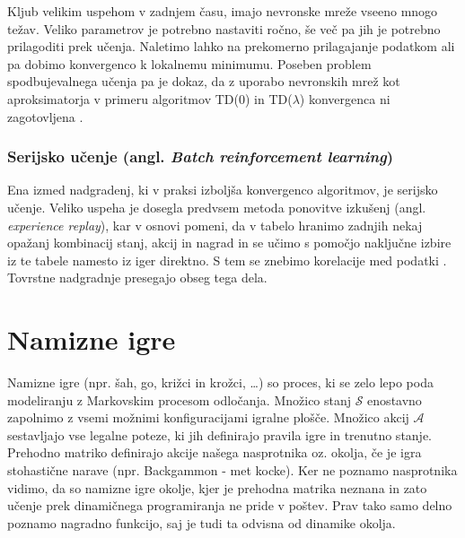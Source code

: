 \documentclass[12pt,a4paper]{amsart}
\theoremstyle{definition} %
\theoremstyle{plain} %
\begin{document}
Kljub velikim uspehom v zadnjem času, imajo nevronske mreže vseeno mnogo težav. Veliko parametrov je 
potrebno nastaviti ročno, še več pa jih je potrebno prilagoditi prek učenja. Naletimo lahko na 
prekomerno prilagajanje podatkom ali pa dobimo konvergenco k lokalnemu minimumu.
Poseben problem spodbujevalnega učenja pa je dokaz, da z uporabo nevronskih mrež kot aproksimatorja 
v primeru algoritmov TD($0$) in TD($\lambda$) konvergenca ni zagotovljena \cite{RLintro}.

\subsubsection{Serijsko učenje (angl. \textit{Batch reinforcement learning})}
Ena izmed nadgradenj, ki v praksi izboljša konvergenco algoritmov, je serijsko učenje. Veliko uspeha 
je dosegla predvsem metoda ponovitve izkušenj (angl. \textit{experience replay}), kar v osnovi pomeni, 
da v tabelo hranimo zadnjih nekaj opažanj kombinacij stanj, akcij in nagrad in se učimo s pomočjo 
naključne izbire iz te tabele namesto iz iger direktno. S tem se znebimo korelacije med podatki 
\cite{LecNotesSilver}. Tovrstne nadgradnje presegajo obseg tega dela.

\section{Namizne igre}\label{nm}
Namizne igre (npr. šah, go, križci in krožci, \dots) so proces, ki se zelo lepo poda modeliranju z 
Markovskim procesom odločanja. Množico stanj $\mathcal{S}$ enostavno zapolnimo z vsemi možnimi 
konfiguracijami igralne plošče. Množico akcij $\mathcal{A}$ sestavljajo vse legalne poteze, ki jih 
definirajo pravila igre in trenutno stanje. Prehodno matriko definirajo akcije našega nasprotnika oz. 
okolja, če je igra stohastične narave (npr. Backgammon - met kocke). Ker ne poznamo nasprotnika vidimo, 
da so namizne igre okolje, kjer je prehodna matrika neznana in zato učenje prek dinamičnega programiranja 
ne pride v poštev. Prav tako samo delno poznamo nagradno funkcijo, saj je tudi ta odvisna od dinamike 
okolja.  
\end{document}
